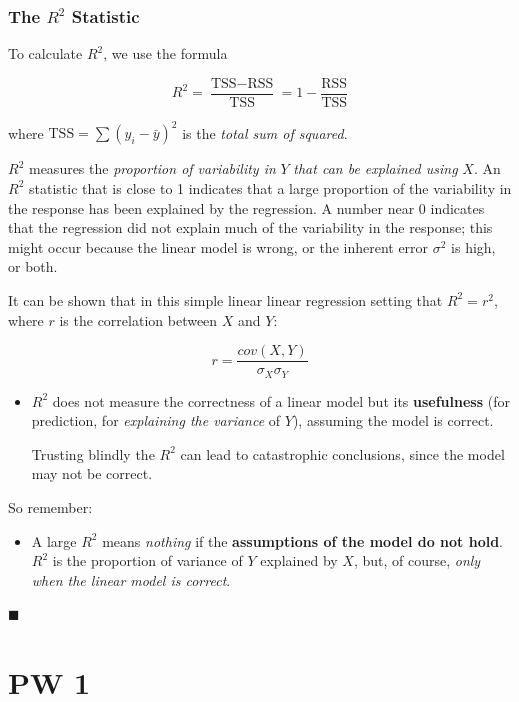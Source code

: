 \documentclass[]{book}
\newenvironment{rmdblock}[1]
  {\begin{shaded*}
  \begin{itemize}
  \renewcommand{\labelitemi}{
    \raisebox{-.7\height}[0pt][0pt]{
      {\setkeys{Gin}{width=2em,keepaspectratio}\texttt{[image: img/icons/\#1]}}
    }
  }
  \item
  }
  {
  \end{itemize}
  \end{shaded*}
  }
\newenvironment{rmdcaution}
  {\begin{rmdblock}{caution}}
  {\end{rmdblock}}
\newenvironment{rmdinsight}
  {\begin{rmdblock}{insight}}
  {\end{rmdblock}}
\begin{document}
\subsection{\texorpdfstring{The \(R^2\)
Statistic}{The R\^{}2 Statistic}}\label{the-r2-statistic}

To calculate \(R^2\), we use the formula

\[ R^2 = \frac{\text{TSS} - \text{RSS}}{\text{TSS}} = 1- \frac{\text{RSS}}{\text{TSS}} \]

where \(\text{TSS} = \sum (y_i - \bar{y})^2\) is the \emph{total sum of
squared}.

\(R^2\) measures the \emph{proportion of variability in} \(Y\)
\emph{that can be explained using} \(X\). An \(R^2\) statistic that is
close to 1 indicates that a large proportion of the variability in the
response has been explained by the regression. A number near 0 indicates
that the regression did not explain much of the variability in the
response; this might occur because the linear model is wrong, or the
inherent error \(\sigma^2\) is high, or both.

It can be shown that in this simple linear linear regression setting
that \(R^2 = r^2\), where \(r\) is the correlation between \(X\) and
\(Y\):

\[ r = \frac{cov(X,Y)}{\sigma_X \sigma_Y} \]

\begin{rmdcaution}
\(R^2\) does not measure the correctness of a linear model but its
\textbf{usefulness} (for prediction, for \emph{explaining the variance}
of \(Y\)), assuming the model is correct.

Trusting blindly the \(R^2\) can lead to catastrophic conclusions, since
the model may not be correct.
\end{rmdcaution}

So remember:

\begin{rmdinsight}
A large \(R^2\) means \emph{nothing} if the \textbf{assumptions of the
model do not hold}. \(R^2\) is the proportion of variance of \(Y\)
explained by \(X\), but, of course, \emph{only when the linear model is
correct}.
\end{rmdinsight}

◼

\chapter*{PW 1}\label{pw-1}
\end{document}
